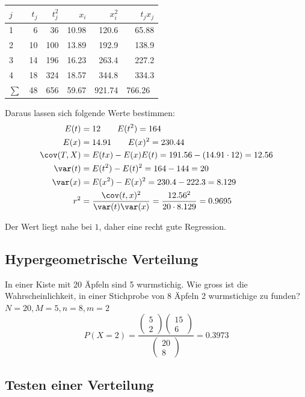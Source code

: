 \begin{center}
	\begin{tabular}{l|rr|rr|r}
		$j$ & $t_j$ & $t^2_j$ & $x_i$ & $x_i^2$ & $t_jx_j$ \\ \toprule
		1 & 6 & 36 & 10.98 & 120.6 & 65.88 \\  \midrule
		2 & 10 & 100 & 13.89 & 192.9 & 138.9 \\  \midrule
		3 & 14 & 196 & 16.23 & 263.4 & 227.2\\  \midrule
		4 & 18 & 324 & 18.57 & 344.8 & 334.3 \\  \bottomrule
		$\sum$  & 48 & 656 &  59.67 & 921.74 & 766.26\
	\end{tabular}
\end{center}

\noindent Daraus lassen sich folgende Werte bestimmen:
\begin{align*}
	E(t) &= 12 \qquad E(t^2) = 164  \\
	E(x) &= 14.91 \qquad E(x)^2 = 230.44  \\
	\cov(T, X) &= E(tx) - E(x)E(t) = 191.56 - (14.91 \cdot 12) = 12.56 \\
	\var(t) &= E(t^2) - E(t)^2 = 164 - 144 = 20 \\
	\var(x) &= E(x^2) - E(x)^2 = 230.4 - 222.3 = 8.129 \\
	r^2 &= \frac{\cov(t, x)^2}{\var(t)\var(x)} = \frac{12.56^2}{20\cdot 8.129} = 0.9695
\end{align*}

\noindent Der Wert liegt nahe bei $1$, daher eine recht gute Regression.

\subsection{Hypergeometrische Verteilung}
In einer Kiste mit 20 Äpfeln sind 5 wurmstichig. Wie gross ist die Wahrscheinlichkeit, in einer Stichprobe von 8 Äpfeln 2 wurmstichige zu funden? $N= 20, M = 5, n = 8, m = 2$
\[
P(X= 2) = \frac{\begin{pmatrix} 5 \\ 2 \end{pmatrix}\begin{pmatrix} 15 \\ 6 \end{pmatrix}}{\begin{pmatrix} 20 \\ 8 \end{pmatrix}} = 0.3973
\]


\subsection{Testen einer Verteilung}
